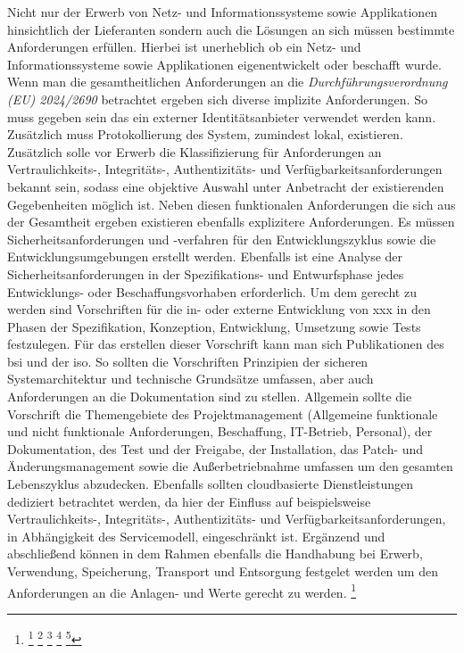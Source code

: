 \documentclass[11pt,a4paper,hidelinks]{article}   %
\begin{document}
            Nicht nur der Erwerb von Netz- und Informationssysteme sowie Applikationen hinsichtlich der Lieferanten sondern auch die Lösungen an sich müssen bestimmte Anforderungen erfüllen. Hierbei ist unerheblich ob ein Netz- und Informationssysteme sowie Applikationen eigenentwickelt oder beschafft wurde. Wenn man die gesamtheitlichen Anforderungen an die \emph{Durchführungsverordnung (EU) 2024/2690} betrachtet ergeben sich diverse implizite Anforderungen. So muss gegeben sein das ein externer Identitätsanbieter verwendet werden kann. Zusätzlich muss Protokollierung des System, zumindest lokal, existieren. Zusätzlich solle vor Erwerb die Klassifizierung für Anforderungen an Vertraulichkeits-, Integritäts-, Authentizitäts- und Verfügbarkeitsanforderungen bekannt sein, sodass eine objektive Auswahl unter Anbetracht der existierenden Gegebenheiten möglich ist. Neben diesen funktionalen Anforderungen die sich aus der Gesamtheit ergeben existieren ebenfalls explizitere Anforderungen. Es müssen Sicherheitsanforderungen und -verfahren für den Entwicklungszyklus sowie die Entwicklungsumgebungen erstellt werden. Ebenfalls ist eine Analyse der Sicherheitsanforderungen in der Spezifikations- und Entwurfsphase jedes Entwicklungs- oder Beschaffungsvorhaben erforderlich. Um dem gerecht zu werden sind Vorschriften für die in- oder externe Entwicklung von xxx in den Phasen der Spezifikation, Konzeption, Entwicklung, Umsetzung sowie Tests festzulegen. Für das erstellen dieser Vorschrift kann man sich Publikationen des \gls{bsi} und der \gls{iso}. So sollten die Vorschriften Prinzipien der sicheren Systemarchitektur und technische Grundsätze umfassen, aber auch Anforderungen an die Dokumentation sind zu stellen. Allgemein sollte die Vorschrift die Themengebiete des Projektmanagement (Allgemeine funktionale und nicht funktionale Anforderungen, Beschaffung, IT-Betrieb, Personal), der Dokumentation, des Test und der Freigabe, der Installation, das Patch- und Änderungsmanagement sowie die Außerbetriebnahme umfassen um den gesamten Lebenszyklus abzudecken. Ebenfalls sollten cloudbasierte Dienstleistungen dediziert betrachtet werden, da hier der Einfluss auf beispielsweise Vertraulichkeits-, Integritäts-, Authentizitäts- und Verfügbarkeitsanforderungen, in Abhängigkeit des Servicemodell, eingeschränkt ist. Ergänzend und abschließend können in dem Rahmen ebenfalls die Handhabung bei Erwerb, Verwendung, Speicherung, Transport und Entsorgung festgelet werden um den Anforderungen an die Anlagen- und Werte gerecht zu werden.
            \footnote{
                \footcite[Vgl.][, S. 369]{9783864900921}
                \footcite[Vgl.][, S. 10]{bsi:1a3676}
                \footcite[Vgl.][, S. 10 - 11, 13]{bsi:e8b2b1}
                \footcite[Vgl.][,  S. 118 - 122]{iso27002-2022}
                \footcite[Vgl.][, S. 6, 9 - 12]{bsi:8ca4cc}
            }
\end{document}
